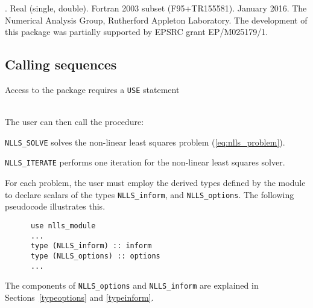 \documentclass{spec}
\begin{document}
\hslheader

\hslsummary



\hslattributes
\hslversions{\versionum\ (\versiondate)}.
\hslIRDCZ Real (single, double).
\hsllanguage Fortran 2003 subset (F95+TR155581).
\hsldate January 2016.
\hslorigin The Numerical Analysis Group, Rutherford Appleton Laboratory.
\hslremark The development of this package was
partially supported by EPSRC grant EP/M025179/1.

\newpage
\hslhowto

\subsection{Calling sequences}

Access to the package requires a {\tt USE} statement \\ \\
\indent\hspace{5mm}{\tt use ral\_nlls\_double}
\medskip

\noindent The user can then call the procedure:
\vspace{-0.1cm}
\begin{description}
\item {\tt NLLS\_SOLVE}  solves the non-linear least squares problem (\ref{eq:nlls_problem}).
\item {\tt NLLS\_ITERATE} performs one iteration for the non-linear least squares solver.
\end{description}


\hsltypes
\label{derived types}
For each problem, the user must employ the derived types defined by the
module to declare scalars of the types {\tt NLLS\_inform}, and
{\tt NLLS\_options}.
The following pseudocode illustrates this.
\begin{verbatim}
      use nlls_module
      ...
      type (NLLS_inform) :: inform
      type (NLLS_options) :: options
      ...
\end{verbatim}
The components of {\tt NLLS\_options} and {\tt NLLS\_inform} are explained
in Sections~\ref{typeoptions} and \ref{typeinform}.
\end{document}
